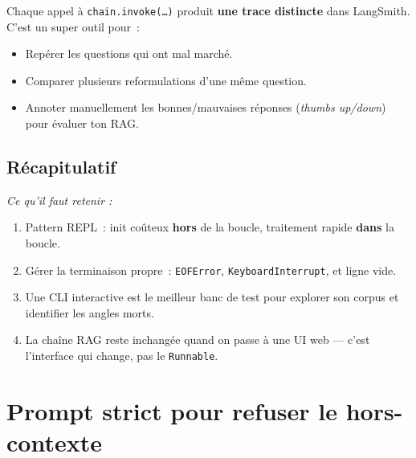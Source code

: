 \documentclass[11pt,a4paper]{article}
\begin{document}
Chaque appel à \texttt{chain.invoke(\dots)} produit \textbf{une trace
distincte} dans LangSmith. C'est un super outil pour~:
\begin{itemize}[leftmargin=*]
  \item Repérer les questions qui ont mal marché.
  \item Comparer plusieurs reformulations d'une même question.
  \item Annoter manuellement les bonnes/mauvaises réponses
        (\emph{thumbs up/down}) pour évaluer ton RAG.
\end{itemize}

\subsection*{Récapitulatif}
{\itshape\sloppy
\textit{Ce qu'il faut retenir :}
\begin{enumerate}[leftmargin=*]
  \item Pattern REPL~: init coûteux \textbf{hors} de la boucle, traitement
        rapide \textbf{dans} la boucle.
  \item Gérer la terminaison propre~: \texttt{EOFError},
        \texttt{KeyboardInterrupt}, et ligne vide.
  \item Une CLI interactive est le meilleur banc de test pour explorer
        son corpus et identifier les angles morts.
  \item La chaîne RAG reste inchangée quand on passe à une UI web — c'est
        l'interface qui change, pas le \texttt{Runnable}.
\end{enumerate}
\par}

\section{Prompt strict pour refuser le hors-contexte}
\end{document}
